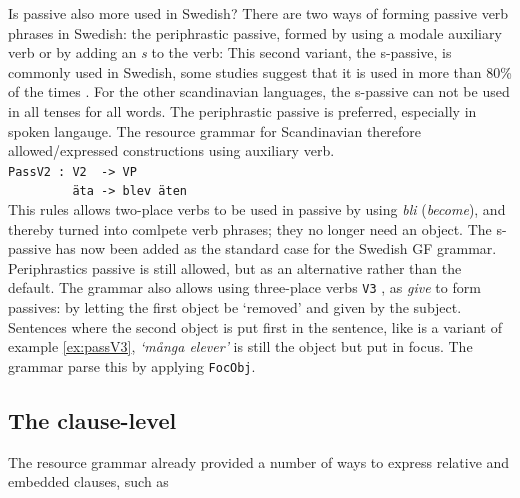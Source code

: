 \documentclass{report}
\begin{document}
Is passive also more used in Swedish?
There are two ways of forming passive verb phrases in Swedish: the 
periphrastic passive, formed by using a modale auxiliary verb 
or by adding an \emph{s} to
the verb:
This second variant, the s-passive, is commonly used in Swedish, some studies
suggest that it is used in more than 80\% of the times \cite{laanemets}.
For the other scandinavian languages, the s-passive can not be used in all tenses for all words.
The periphrastic passive is preferred, especially in spoken langauge.
The resource grammar for Scandinavian therefore allowed/expressed constructions using auxiliary verb. \\
\verb|PassV2 : V2  -> VP | \\
\verb|         äta -> blev äten| \\
This rules allows two-place verbs to be used in passive by using \emph{bli} (\emph{become}), and thereby
turned into comlpete verb phrases; they no longer need an object.
The s-passive has now been added as the standard case for the Swedish GF
grammar. Periphrastics passive is still allowed, but as an alternative rather
than the default.
The grammar also allows using three-place verbs \verb|V3| , as \emph{give} to
form passives:
\label{ex:passV3}
by letting the first object be `removed' and given by the subject. 
Sentences where the second object is put first in the sentence, like 
is a variant of example \ref{ex:passV3}, \emph{`många elever'} is still the object but put in focus. The grammar
parse this by applying \verb|FocObj|.

\subsection{The clause-level}
The resource grammar already provided a number of ways to express relative and embedded clauses, such as
\end{document}
